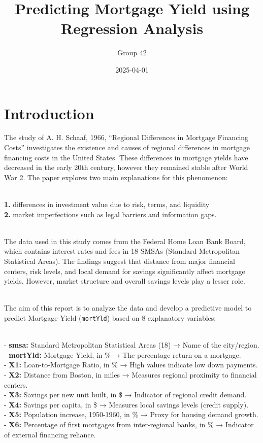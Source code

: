 \documentclass[
  11pt,
]{article}
\title{Predicting Mortgage Yield using Regression Analysis}
\author{Group 42}
\date{2025-04-01}
\begin{document}
\maketitle

\section{Introduction}\label{introduction}

The study of A. H. Schaaf, 1966, ``Regional Differences in Mortgage
Financing Costs'' investigates the existence and causes of regional
differences in mortgage financing costs in the United States. These
differences in mortgage yields have decreased in the early 20th century,
however they remained stable after World War 2. The paper explores two
main explanations for this phenomenon:\\
\strut \\
\textbf{1.} differences in investment value due to risk, terms, and
liquidity\\
\textbf{2.} market imperfections such as legal barriers and information
gaps.\\
\strut \\
The data used in this study comes from the Federal Home Loan Bank Board,
which contains interest rates and fees in 18 SMSAs (Standard
Metropolitan Statistical Areas). The findings suggest that distance from
major financial centers, risk levels, and local demand for savings
significantly affect mortgage yields. However, market structure and
overall savings levels play a lesser role.\\
\strut \\
The aim of this report is to analyze the data and develop a predictive
model to predict Mortgage Yield (\texttt{mortYld}) based on 8
explanatory variables:\\
\strut \\
- \textbf{smsa:} Standard Metropolitan Statistical Areas (18) → Name of
the city/region.\\
- \textbf{mortYld:} Mortgage Yield, in \% → The percentage return on a
mortgage.\\
- \textbf{X1:} Loan-to-Mortgage Ratio, in \% → High values indicate low
down payments.\\
- \textbf{X2:} Distance from Boston, in miles → Measures regional
proximity to financial centers.\\
- \textbf{X3:} Savings per new unit built, in \$ → Indicator of regional
credit demand.\\
- \textbf{X4:} Savings per capita, in \$ → Measures local savings levels
(credit supply).\\
- \textbf{X5:} Population increase, 1950-1960, in \% → Proxy for housing
demand growth.\\
- \textbf{X6:} Percentage of first mortgages from inter-regional banks,
in \% → Indicator of external financing reliance.\\
\end{document}
